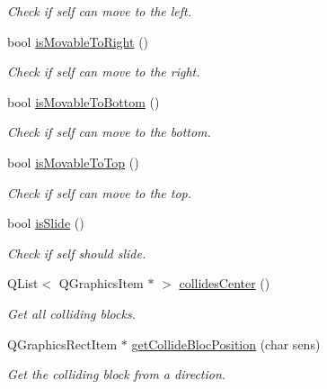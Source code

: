 \begin{DoxyCompactItemize}
\begin{DoxyCompactList}\small\item\em Check if self can move to the left. \end{DoxyCompactList}\item 
bool \hyperlink{class_b___movable_a36fab7cd8d7d7d6d026d054512c10929}{is\+Movable\+To\+Right} ()
\begin{DoxyCompactList}\small\item\em Check if self can move to the right. \end{DoxyCompactList}\item 
bool \hyperlink{class_b___movable_a4b9fda4b276b9d9448bcc9e8feec6cb5}{is\+Movable\+To\+Bottom} ()
\begin{DoxyCompactList}\small\item\em Check if self can move to the bottom. \end{DoxyCompactList}\item 
bool \hyperlink{class_b___movable_acdd4c8c72909da2994e79dff5f24f71b}{is\+Movable\+To\+Top} ()
\begin{DoxyCompactList}\small\item\em Check if self can move to the top. \end{DoxyCompactList}\item 
bool \hyperlink{class_b___movable_a44d1413ec8bceda3b1a50c673b429d03}{is\+Slide} ()
\begin{DoxyCompactList}\small\item\em Check if self should slide. \end{DoxyCompactList}\item 
Q\+List$<$ Q\+Graphics\+Item $\ast$ $>$ \hyperlink{class_b___movable_ab597ec57dd4bfed453d5e329a2b82990}{collides\+Center} ()
\begin{DoxyCompactList}\small\item\em Get all colliding blocks. \end{DoxyCompactList}\item 
Q\+Graphics\+Rect\+Item $\ast$ \hyperlink{class_b___movable_a4cb26e3d494505eaaa6773c0a448c479}{get\+Collide\+Bloc\+Position} (char sens)
\begin{DoxyCompactList}\small\item\em Get the colliding block from a direction. \end{DoxyCompactList}\end{DoxyCompactItemize}
